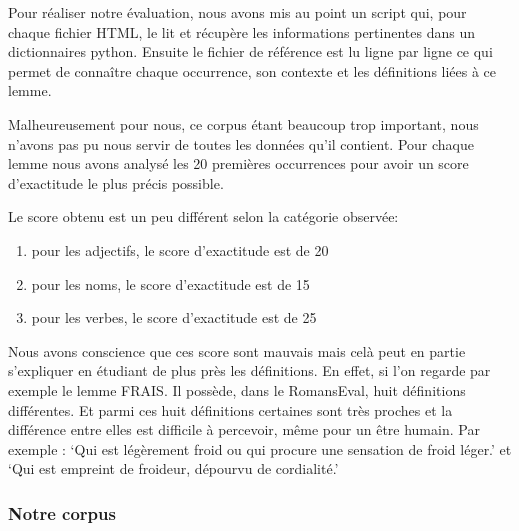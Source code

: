 Pour réaliser notre évaluation, nous avons mis au point un script qui, pour 
chaque fichier HTML, le lit et récupère les informations pertinentes dans un 
dictionnaires python. Ensuite le fichier de référence est lu ligne par ligne 
ce qui permet de connaître chaque occurrence, son contexte et les définitions 
liées à ce lemme.

Malheureusement pour nous, ce corpus étant beaucoup trop important, nous 
n'avons pas pu nous servir de toutes les données qu'il contient. Pour chaque 
lemme nous avons analysé les 20 premières occurrences pour avoir un score 
d'exactitude le plus précis possible.

Le score obtenu est un peu différent selon la catégorie observée:

\begin{enumerate}
 \item pour les adjectifs, le score d'exactitude est de 20%
 \item pour les noms, le score d'exactitude est de 15%
 \item pour les verbes, le score d'exactitude est de 25%
\end{enumerate}

Nous avons conscience que ces score sont mauvais mais celà peut en partie 
s'expliquer en étudiant de plus près les définitions. En effet, si l'on regarde 
par exemple le lemme FRAIS. Il possède, dans le RomansEval, huit définitions 
différentes. Et parmi ces huit définitions certaines sont très proches et la 
différence entre elles est difficile à percevoir, même pour un être humain. Par 
exemple : `Qui est légèrement froid ou qui procure une sensation de froid 
léger.' et `Qui est empreint de froideur, dépourvu de cordialité.'

\subsubsection{Notre corpus}



